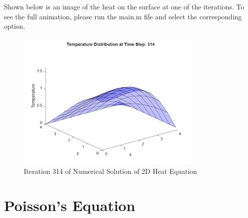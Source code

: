\documentclass{article}
\begin{document}
Shown below is an image of the heat on the surface at one of the iterations. To see the full animation, please run the main.m file and select the corresponding option.
\begin{figure}[H]
    \centering
    \includegraphics[width=0.8\textwidth]{2D_example.jpg}
    \caption{Iteration 314 of Numerical Solution of 2D Heat Equation}
\end{figure}

\section{Poisson's Equation}
\end{document}
